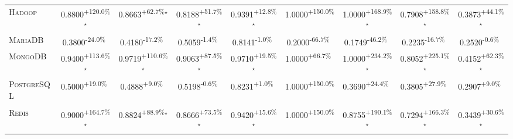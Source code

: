\begin{table}[htbp]
\begin{tabular}{l|cccc|cccc}
\textsc{Hadoop} & \cellcolor{green!30}0.8800\textsuperscript{+120.0\%}$^\star$ & \cellcolor{green!30}0.8663\textsuperscript{+62.7\%}$^\star$ & \cellcolor{green!30}0.8188\textsuperscript{+51.7\%}$^\star$ & \cellcolor{green!30}0.9391\textsuperscript{+12.8\%}$^\star$ & \cellcolor{green!30}1.0000\textsuperscript{+150.0\%}$^{\,\,\,}$ & \cellcolor{green!30}1.0000\textsuperscript{+168.9\%}$^\star$ & \cellcolor{green!30}0.7908\textsuperscript{+158.8\%}$^\star$ & \cellcolor{green!30}0.3873\textsuperscript{+44.1\%}$^\star$ \\
\textsc{MariaDB} & \cellcolor{red!30}0.3800\textsuperscript{-24.0\%}$^{\,\,\,}$ & \cellcolor{red!30}0.4180\textsuperscript{-17.2\%}$^{\,\,\,}$ & \cellcolor{red!30}0.5059\textsuperscript{-1.4\%}$^{\,\,\,}$ & \cellcolor{red!30}0.8141\textsuperscript{-1.0\%}$^{\,\,\,}$ & \cellcolor{red!30}0.2000\textsuperscript{-66.7\%}$^{\,\,\,}$ & \cellcolor{red!30}0.1749\textsuperscript{-46.2\%}$^{\,\,\,}$ & \cellcolor{red!30}0.2235\textsuperscript{-16.7\%}$^{\,\,\,}$ & \cellcolor{red!30}0.2520\textsuperscript{-0.6\%}$^{\,\,\,}$ \\
\textsc{MongoDB} & \cellcolor{green!30}0.9400\textsuperscript{+113.6\%}$^\star$ & \cellcolor{green!30}0.9719\textsuperscript{+110.6\%}$^\star$ & \cellcolor{green!30}0.9063\textsuperscript{+87.5\%}$^\star$ & \cellcolor{green!30}0.9710\textsuperscript{+19.5\%}$^\star$ & \cellcolor{green!30}1.0000\textsuperscript{+66.7\%}$^{\,\,\,}$ & \cellcolor{green!30}1.0000\textsuperscript{+234.2\%}$^\star$ & \cellcolor{green!30}0.8052\textsuperscript{+225.1\%}$^\star$ & \cellcolor{green!30}0.4152\textsuperscript{+62.3\%}$^\star$ \\
\textsc{PostgreSQL} & \cellcolor{green!30}0.5000\textsuperscript{+19.0\%}$^{\,\,\,}$ & \cellcolor{green!30}0.4888\textsuperscript{+9.0\%}$^{\,\,\,}$ & \cellcolor{red!30}0.5198\textsuperscript{-0.6\%}$^{\,\,\,}$ & \cellcolor{green!30}0.8231\textsuperscript{+1.0\%}$^{\,\,\,}$ & \cellcolor{green!30}1.0000\textsuperscript{+150.0\%}$^{\,\,\,}$ & \cellcolor{green!30}0.3690\textsuperscript{+24.4\%}$^{\,\,\,}$ & \cellcolor{green!30}0.3805\textsuperscript{+27.9\%}$^{\,\,\,}$ & \cellcolor{green!30}0.2907\textsuperscript{+9.0\%}$^{\,\,\,}$ \\
\textsc{Redis} & \cellcolor{green!30}0.9000\textsuperscript{+164.7\%}$^\star$ & \cellcolor{green!30}0.8824\textsuperscript{+88.9\%}$^\star$ & \cellcolor{green!30}0.8666\textsuperscript{+73.5\%}$^\star$ & \cellcolor{green!30}0.9420\textsuperscript{+15.6\%}$^\star$ & \cellcolor{green!30}1.0000\textsuperscript{+150.0\%}$^{\,\,\,}$ & \cellcolor{green!30}0.8755\textsuperscript{+190.1\%}$^\star$ & \cellcolor{green!30}0.7294\textsuperscript{+166.3\%}$^\star$ & \cellcolor{green!30}0.3439\textsuperscript{+30.6\%}$^\star$ \\

\end{tabular}
\end{table}
